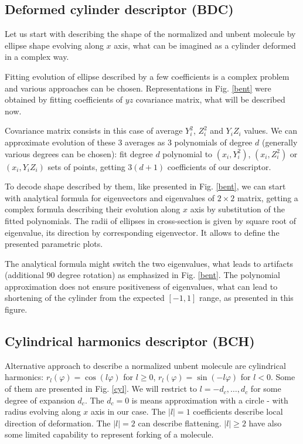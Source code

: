 \documentclass[10pt,journal]{IEEEtranTCOM}
\theoremstyle{plain}
\begin{document}
\subsection{Deformed cylinder descriptor (BDC)}
Let us start with describing the shape of the normalized and unbent molecule by ellipse shape evolving along $x$ axis, what can be imagined as a cylinder deformed in a complex way.

Fitting evolution of ellipse described by a few coefficients is a complex problem and various approaches can be chosen. Representations in Fig. \ref{bent} were obtained by fitting coefficients of $yz$ covariance matrix, what will be described now.

Covariance matrix consists in this case of average $Y_i^2$, $Z_i^2$ and $Y_i Z_i$ values. We can approximate evolution of these 3 averages as 3 polynomials of degree $d$ (generally various degrees can be chosen): fit degree $d$ polynomial to $(x_i,Y_i^2)$, $(x_i,Z_i^2)$ or $(x_i,Y_i Z_i)$ sets of points, getting $3(d+1)$ coefficients of our descriptor.

To decode shape described by them, like presented in Fig. \ref{bent}, we can start with analytical formula for eigenvectors and eigenvalues of $2\times 2$ matrix, getting a complex formula describing their evolution along $x$ axis by substitution of the fitted polynomials. The radii of ellipses in cross-section is given by square root of eigenvalue, its direction by corresponding eigenvector. It allows to define the presented parametric plots.

The analytical formula might switch the two eigenvalues, what leads to artifacts (additional 90 degree rotation) as emphasized in Fig. \ref{bent}. The polynomial approximation does not ensure positiveness of eigenvalues, what can lead to shortening of the cylinder from the expected $[-1,1]$ range, as presented in this figure.
\subsection{Cylindrical harmonics descriptor (BCH)}
Alternative approach to describe a normalized unbent molecule are cylindrical harmonics: $r_l(\varphi)=\cos(l\varphi)$ for $l\geq 0$, $r_l(\varphi)=\sin(-l\varphi)$ for $l<0$. Some of them are presented in Fig. \ref{cyl}. We will restrict to $l=-d_c,\ldots, d_c$
for some degree of expansion $d_c$. The $d_c=0$ is means approximation with a circle - with radius evolving along $x$ axis in our case. The $|l|=1$ coefficients describe local direction of deformation. The $|l|=2$ can describe flattening. $|l|\geq 2$ have also some limited capability to represent forking of a molecule.
\end{document}
